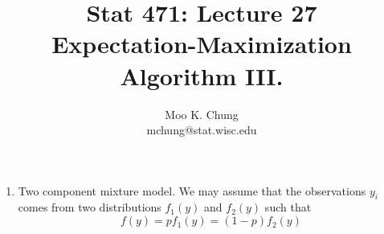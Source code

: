 \documentclass[11pt,twocolumn]{article} %
\begin{document}
\title{Stat 471: Lecture 27\\
Expectation-Maximization Algorithm III.}
\author{Moo K. Chung\\
mchung@stat.wisc.edu}
\maketitle \thispagestyle{empty}
\begin{enumerate}

\item Two component mixture model. We may assume that the observations $y_i$
comes from two distributions $f_1(y)$ and $f_2(y)$ such that 
$$f(y) = pf_1(y) = (1-p)f_2(y)$$


\end{enumerate}
\end{document}
